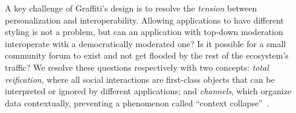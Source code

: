 


A key challenge of Graffiti's design is to resolve
the \emph{tension} between personalization and interoperability.
Allowing applications to have different styling is
not a problem, but can an application with top-down
moderation interoperate with a democratically moderated one?
Is it possible for a small community forum to exist and
not get flooded by the rest of the ecosystem's traffic?
We resolve these questions respectively with two concepts: \emph{total reification},
where all social interactions
are first-class objects that
can be interpreted or ignored by different applications;
and \emph{channels}, which organize data contextually,
preventing a phenomenon called ``context collapse''~\cite{contextcollapse}.


